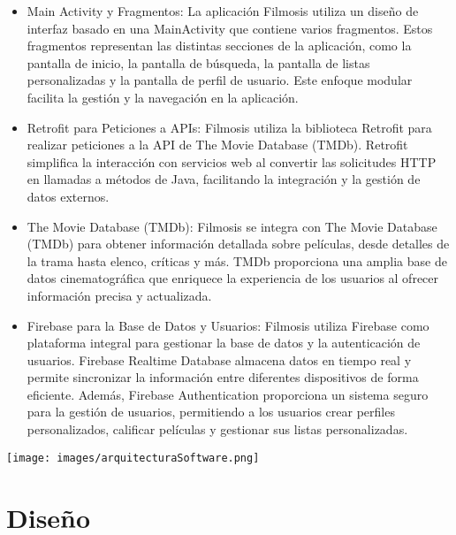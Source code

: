 \documentclass{article}
\begin{document}
\begin{itemize}
    \item Main Activity y Fragmentos: La aplicación Filmosis utiliza un diseño de interfaz basado en una MainActivity que contiene varios fragmentos. Estos fragmentos representan las distintas secciones de la aplicación, como la pantalla de inicio, la pantalla de búsqueda, la pantalla de listas personalizadas y la pantalla de perfil de usuario. Este enfoque modular facilita la gestión y la navegación en la aplicación.
    
    \item Retrofit para Peticiones a APIs: Filmosis utiliza la biblioteca Retrofit para realizar peticiones a la API de The Movie Database (TMDb). Retrofit simplifica la interacción con servicios web al convertir las solicitudes HTTP en llamadas a métodos de Java, facilitando la integración y la gestión de datos externos.
    
    \item The Movie Database (TMDb): Filmosis se integra con The Movie Database (TMDb) para obtener información detallada sobre películas, desde detalles de la trama hasta elenco, críticas y más. TMDb proporciona una amplia base de datos cinematográfica que enriquece la experiencia de los usuarios al ofrecer información precisa y actualizada.
    
    \item Firebase para la Base de Datos y Usuarios: Filmosis utiliza Firebase como plataforma integral para gestionar la base de datos y la autenticación de usuarios. Firebase Realtime Database almacena datos en tiempo real y permite sincronizar la información entre diferentes dispositivos de forma eficiente. Además, Firebase Authentication proporciona un sistema seguro para la gestión de usuarios, permitiendo a los usuarios crear perfiles personalizados, calificar películas y gestionar sus listas personalizadas.

\end{itemize}

\vspace{1cm}

\begin{minipage}{1\textwidth}
    \centering
    \texttt{[image: images/arquitecturaSoftware.png]}
\end{minipage}

\section{Diseño}
\end{document}
